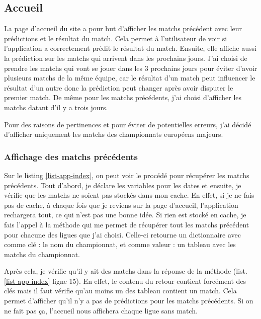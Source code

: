 \documentclass[a4paper,14pt]{extarticle}
\begin{document}
{\subsection{Accueil}
\label{flaskAccueil}

La page d'accueil du site a pour but d'afficher les matchs précédent avec leur prédictions et le résultat du match. Cela permet à l'utilisateur de voir si l'application a correctement prédit le résultat du match. Ensuite, elle affiche aussi la prédiction sur les matchs qui arrivent dans les prochains jours. J'ai choisi de prendre les matchs qui vont se jouer dans les 3 prochains jours pour éviter d'avoir plusieurs matchs de la même équipe, car le résultat d'un match peut influencer le résultat d'un autre donc la prédiction peut changer après avoir disputer le premier match. De même pour les matchs précédents, j'ai choisi d'afficher les matchs datant d'il y a trois jours.

Pour des raisons de pertinences et pour éviter de potentielles erreurs, j'ai décidé d'afficher uniquement les matchs des championnats européens majeurs.

\subsubsection{Affichage des matchs précédents}

Sur le listing \ref{list-app-index}, on peut voir le procédé pour récupérer les matchs précédents. Tout d'abord, je déclare les variables pour les dates et ensuite, je vérifie que les matchs ne soient pas stockés dans mon cache. En effet, si je ne fais pas de cache, à chaque fois que je reviens sur la page d'accueil, l'application rechargera tout, ce qui n'est pas une bonne idée. Si rien est stocké en cache, je fais l'appel à la méthode qui me permet de récupérer tout les matchs précédent pour chacune des ligues que j'ai choisi. Celle-ci retourne un dictionnaire avec comme clé : le nom du championnat, et comme valeur : un tableau avec les matchs du championnat. 

Après cela, je vérifie qu'il y ait des matchs dans la réponse de la méthode (list. \ref{list-app-index} ligne 15). En effet, le contenu du retour contient forcément des clés mais il faut vérifie qu'au moins un des tableau contient un match. Cela permet d'afficher qu'il n'y a pas de prédictions pour les matchs précédents. Si on ne fait pas ça, l'accueil nous affichera chaque ligue sans match.


}
\end{document}
